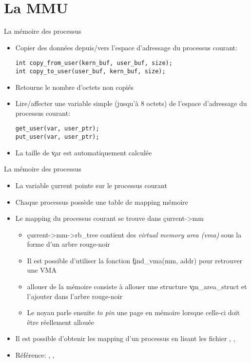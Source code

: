 \section{La MMU}

\begin{frame}[fragile=singleslide]{La mémoire des processus}
  \begin{itemize} 
  \item  Copier  des   données  depuis/vers  l'espace  d'adressage  du
    processus courant:
    \begin{lstlisting} 
int copy_from_user(kern_buf, user_buf, size);
int copy_to_user(user_buf, kern_buf, size);
    \end{lstlisting} 
  \item Retourne le nombre d'octets non copiés
  \item  Lire/affecter  une  variable  simple (jusqu'à  8  octets)  de
    l'espace d'adressage du processus courant:
    \begin{lstlisting} 
get_user(var, user_ptr);
put_user(var, user_ptr);
    \end{lstlisting} 
  \item  La taille de \c{var} est automatiquement calculée
  \end{itemize}
\end{frame}

\begin{frame}[fragile=singleslide]{La mémoire des processus}
  \begin{itemize} 
  \item La variable \c{current} pointe sur le processus courant
  \item Chaque processus possède une table de mapping mémoire
  \item Le mapping du processus courant se trouve dans \c{current->mm}
    \begin{itemize} 
    \item  \c{current->mm->rb_tree} contient des  \emph{virtual memory
        area (vma)} sous la forme d'un arbre rouge-noir
    \item     Il    est     possible     d'utiliser    la     fonction
      \c{find_vma(mm, addr)} pour retrouver une VMA
    \item  allouer de  la  mémoire consiste  à  allouer une  structure
      \c{vm_area_struct} et l'ajouter dans l'arbre rouge-noir
    \item Le  noyau parle  ensuite \emph{to pin}  une page  en mémoire
      lorsque celle-ci doit être réellement allouée
    \end{itemize} 
  \item Il est possible d'obtenir les mapping d'un processus en lisant
    les   fichier   ,   ,
  \item         Référence:        ,
    , 
  \end{itemize} 
\end{frame} 

